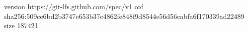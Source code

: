 version https://git-lfs.github.com/spec/v1
oid sha256:509ce6bd2b3747e653b37c4862fe848f9d8544e56d56cabfa6f170339ad22489
size 187421

